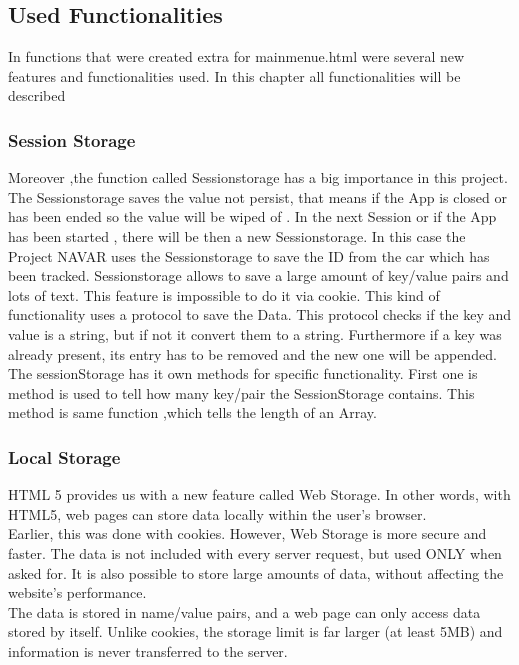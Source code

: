 \subsection{Used Functionalities}
In functions that were created extra for mainmenue.html were several new features and functionalities used. In this chapter all functionalities will be described 
\\

\subsubsection{Session Storage}
Moreover ,the function called Sessionstorage has a big importance in this project. The Sessionstorage saves the value not persist, that means if the App is closed or has been ended so the value will be wiped of . In the next Session or if the App has been started , there will be then a new Sessionstorage. In this case the Project NAVAR uses the Sessionstorage to save the ID from the car which has been tracked. Sessionstorage allows  to save a large amount of  key/value pairs and lots of text. This feature is impossible to do it via cookie. This kind of functionality uses  a protocol to save the Data. This protocol checks if the key and value is a string, but if not it convert them to a string. Furthermore if a key was already present, its entry  has to be removed and the new one will be appended. The sessionStorage has it own methods for specific functionality.
First one is method is used to tell how many key/pair the SessionStorage contains. This method is same function ,which tells the length of an Array.

\subsubsection{Local Storage}

HTML 5 provides us with a new feature called Web Storage. In other words, with HTML5, web pages can store data locally within the user's browser.
\\

Earlier, this was done with cookies. However, Web Storage is more secure and faster. The data is not included with every server request, but used ONLY when asked for. It is also possible to store large amounts of data, without affecting the website's performance.
\\

The data is stored in name/value pairs, and a web page can only access data stored by itself. Unlike cookies, the storage limit is far larger (at least 5MB) and information is never transferred to the server.
\\

